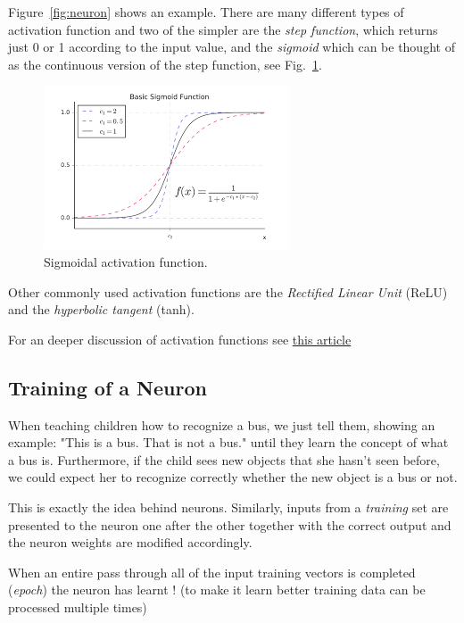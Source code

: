 Figure~\ref{fig:neuron} shows an example.
There are many different types of activation function and two of the simpler are the \emph{step function},
which returns just 0 or 1 according
to the input value, and the \emph{sigmoid} which can be thought
of as the continuous version of the step function, see Fig.~\ref{fig:sigmoid}.

\begin{figure}[htb]
	\centering
	\includegraphics{figures/sigmoid.png}
	\caption{Sigmoidal activation function.}
        \label{fig:sigmoid}
\end{figure}

Other commonly used activation functions are the \emph{Rectified Linear Unit}
(ReLU) and the \emph{hyperbolic tangent} (tanh).

For an deeper discussion of activation functions see
\href{https://medium.com/the-theory-of-everything/understanding-activation-functions-in-neural-networks-9491262884e0}{this article}

\subsection{Training of a Neuron}\label{training-of-a-neuron}

When teaching children how to recognize a bus, we just tell them,
showing an example: "This is a bus. That is not a bus." until they
learn the concept of what a bus is. Furthermore, if the child sees new
objects that she hasn't seen before, we could expect her to recognize
correctly whether the new object is a bus or not.

This is exactly the idea behind neurons. Similarly, inputs from a
\emph{training} set are presented to the neuron one after the other
together with the correct output and the neuron weights are modified
accordingly.

When an entire pass through all of the input training vectors is
completed (\emph{epoch}) the neuron has learnt ! (to make it learn better
training data can be processed multiple times)

